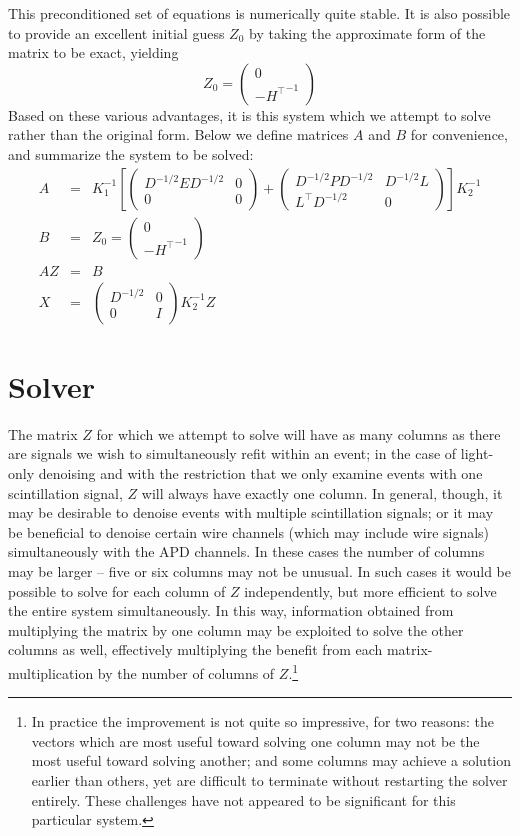 This preconditioned set of equations is numerically quite stable.  It is also possible to provide an excellent initial guess $Z_0$ by taking the approximate form of the matrix to be exact, yielding
\[
Z_0 = \begin{pmatrix}0\\-{H^\top}^{-1}\end{pmatrix}
\]
Based on these various advantages, it is this system which we attempt to solve rather than the original form.  Below we define matrices $A$ and $B$ for convenience, and summarize the system to be solved:
\[\begin{array}{rcl}
A &=& K_1^{-1} 
\left[
\begin{pmatrix}D^{-1/2}ED^{-1/2}&0\\0&0\end{pmatrix}
+
\begin{pmatrix}D^{-1/2}PD^{-1/2}&D^{-1/2}L\\L^\top D^{-1/2}&0\end{pmatrix}
\right]
K_2^{-1}\\
B &=& Z_0 = \begin{pmatrix}0\\-{H^\top}^{-1}\end{pmatrix}\\
AZ &=& B\\
X &=&  \begin{pmatrix}D^{-1/2}&0\\0&I\end{pmatrix}K_2^{-1}Z
\end{array}\]


\section{Solver}

The matrix $Z$ for which we attempt to solve will have as many columns as there are signals we wish to simultaneously refit within an event; in the case of light-only denoising and with the restriction that we only examine events with one scintillation signal, $Z$ will always have exactly one column.  In general, though, it may be desirable to denoise events with multiple scintillation signals; or it may be beneficial to denoise certain wire channels (which may include wire signals) simultaneously with the APD channels.  In these cases the number of columns may be larger -- five or six columns may not be unusual.  In such cases it would be possible to solve for each column of $Z$ independently, but more efficient to solve the entire system simultaneously.  In this way, information obtained from multiplying the matrix by one column may be exploited to solve the other columns as well, effectively multiplying the benefit from each matrix-multiplication by the number of columns of $Z$.\footnote{In practice the improvement is not quite so impressive, for two reasons: the vectors which are most useful toward solving one column may not be the most useful toward solving another; and some columns may achieve a solution earlier than others, yet are difficult to terminate without restarting the solver entirely.  These challenges have not appeared to be significant for this particular system.}

